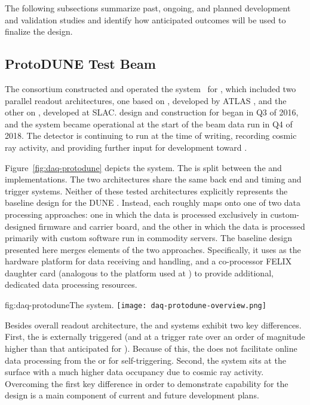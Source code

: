 The following subsections summarize past, ongoing, and planned
development and validation studies and identify how anticipated outcomes
will be used to finalize the  design.

\subsection{ProtoDUNE Test Beam}

\label{sec:fd-daq:protodune}

The   consortium constructed and operated the  system~\cite{Sipos:2018auh} for , which included two parallel  readout architectures, one based on , developed by ATLAS \cite{atlas-felix}, and the other on , developed at SLAC.  design and construction for  began in Q3 of 2016, and the system became operational at the start of the beam data run in Q4 of 2018. The detector is continuing to run at the time of writing, recording cosmic ray activity, and providing further input for  development toward . 

Figure~\ref{fig:daq-protodune} depicts the   system. 
The  is split between the  and 
\cite{bib:docdb1881} implementations. The two architectures share the
same back end and timing and trigger systems.  
Neither of these tested architectures explicitly represents the baseline design for the DUNE . Instead, each roughly maps onto one of two data processing approaches: one in which the data is processed exclusively in custom-designed  firmware and carrier board, and the other in which the data is processed primarily with custom software run in commodity servers. The baseline design presented here merges elements of the two approaches. Specifically, it uses  as the hardware platform for data receiving and handling, and a co-processor FELIX daughter card (analogous to the  platform used at ) to provide additional, dedicated data processing resources.


\begin{dunefigure}{fig:daq-protodune}{The   system.}
 \texttt{[image: daq-protodune-overview.png]}
\end{dunefigure}

Besides overall readout architecture, the  and   systems exhibit two key differences. 
First, the   is externally triggered (and at a trigger rate over an order of magnitude higher than that anticipated for ). Because of this, the   does not facilitate online data processing from the  or  for self-triggering. 
Second, the  system sits at the surface with a much higher data occupancy due to cosmic ray activity.
Overcoming the first key difference in order to demonstrate
 capability for the   design is a
main component of current and future  development plans.


